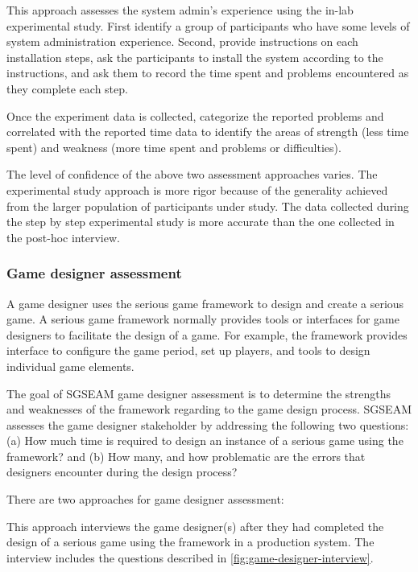 \label{In-lab system admin study}

This approach assesses the system admin's experience using the in-lab experimental study. First identify a group 
of participants who have some levels of system administration experience. Second, provide instructions on 
each installation steps, ask the participants to install the system according to the instructions, and ask them to record 
the time spent and problems encountered as they complete each step.

Once the experiment data is collected, categorize the reported problems and correlated with the reported time data 
to identify the areas of strength (less time spent) and weakness (more time spent and problems or difficulties). 

The level of confidence of the above two assessment approaches varies. The experimental study
approach is more rigor because of the generality achieved from the larger population of
participants under study. The data collected during the step by step experimental study is more
accurate than the one collected in the post-hoc interview.

\subsubsection{Game designer assessment}

A game designer uses the serious game framework to design and create a serious game.
A serious game framework normally provides tools or interfaces for game designers
to facilitate the design of a game. For example, the framework provides interface to configure the game period, set up 
players, and tools to design individual game elements.

The goal of SGSEAM game designer assessment is to determine the strengths and weaknesses of the framework 
regarding to the game design process. SGSEAM assesses the game designer stakeholder by addressing the following 
two questions: (a) How much time is required to design an instance of a serious game using the framework? and (b) How
many, and how problematic are the errors that designers encounter during the design process?

There are two approaches for game designer assessment:

\label{Post-hoc game designer interview}

This approach interviews the game designer(s) after they had completed the design of a serious game using the 
framework in a production system. The interview includes the questions described in \autoref{fig:game-designer-interview}.
 
